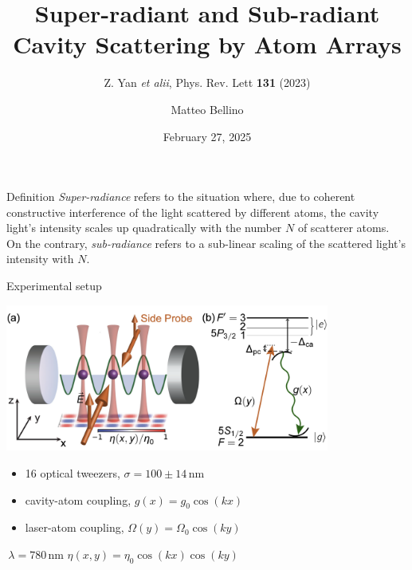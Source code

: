 \documentclass{beamer}
\author{Matteo Bellino}
\title{Super-radiant and Sub-radiant Cavity Scattering by Atom Arrays}
\subtitle{Z. Yan \textit{et alii}, Phys. Rev. Lett \textbf{131} (2023)}
\date{February 27, 2025}
\begin{document}
\frame{\maketitle}
\begin{frame}{Definition}
	\alert{\textit{Super-radiance}} refers to the situation where, due to coherent constructive interference of the light scattered by different atoms, the cavity light's intensity scales up quadratically with the number $N$ of scatterer atoms.\newline
	~\newline
	On the contrary, \alert{\textit{sub-radiance}} refers to a sub-linear scaling of the scattered light's intensity with $N$.
\end{frame}

\begin{frame}{Experimental setup}
	\begin{minipage}{\textwidth}
		\centering
		\includegraphics[width=0.8\textwidth]{Figure_1.png}
		\hspace{3em}
	\end{minipage}\newline
	\vspace{2em}
	\begin{minipage}{\textwidth}
		\begin{minipage}{0.57\textwidth}
			\begin{itemize}
				\item {\small 16 optical tweezers, $\sigma = 100\pm14\,$nm\pause}
				\item {\small cavity-atom coupling, $g(x)=g_0\cos(kx)$}\pause
				\item {\small laser-atom coupling, $\Omega(y)=\Omega_0\cos(ky)$}
			\end{itemize}
		\end{minipage}
		\begin{minipage}{0.42\textwidth}
			\centering
			$\,\lambda=780\,$nm\newline
			\alert{$\eta(x,y)=\eta_0\cos(kx)\cos(ky)$}
		\end{minipage}
	\end{minipage}
\end{frame}
\end{document}
